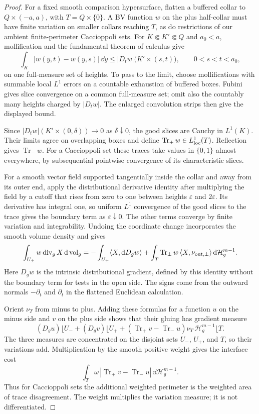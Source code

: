 \begin{proof}
For a fixed smooth comparison hypersurface, flatten a buffered collar to
$Q\times(-a,a)$, with $T=Q\times\{0\}$. A BV function $w$ on the
plus half-collar must have finite variation on smaller collars reaching
$T$, as do restrictions of our ambient finite-perimeter Caccioppoli sets. For
$K\Subset K'\Subset Q$ and $a_0<a$, mollification and the fundamental
theorem of calculus give
\begin{equation}\label{cut:fixed-face-slices}
 \int_K |w(y,t)-w(y,s)|\,\dd y
 \le |D_t w|\bigl(K'\times(s,t)\bigr),
 \qquad 0<s<t<a_0,
\end{equation}
on one full-measure set of heights. To pass to the limit, choose
mollifications with summable local $L^1$ errors on a countable exhaustion
of buffered boxes. Fubini gives slice convergence on a common
full-measure set; omit also the countably many heights charged by
$|D_t w|$. The enlarged convolution strips then give the displayed bound.

Since $|D_t w|(K'\times(0,\delta))\to0$ as $\delta\downarrow0$,
the good slices are Cauchy in $L^1(K)$. Their limits agree on overlapping
boxes and define $\operatorname{Tr}_+w\in L^1_{\rm loc}(T)$.
Reflection gives $\operatorname{Tr}_-w$. For a Caccioppoli set these traces take
values in $\{0,1\}$ almost everywhere, by subsequential pointwise
convergence of its characteristic slices.

For a smooth vector field supported tangentially inside the collar and
away from its outer end, apply the distributional derivative identity
after multiplying the field by a cutoff that rises from zero to one
between heights $\varepsilon$ and $2\varepsilon$. Its derivative has
integral one, so uniform $L^1$ convergence of the good slices to the
trace gives the boundary term as $\varepsilon\downarrow0$. The other
terms converge by finite variation and integrability. Undoing the
coordinate change incorporates the smooth volume density and gives
\[
 \int_{U_\pm}w\operatorname{div}_g X\,\mathrm d\operatorname{vol}_g
 =-\int_{U_\pm}\langle X,\mathrm d D_g w\rangle
   +\int_T\operatorname{Tr}_\pm w\,
              \langle X,\nu_{\mathrm{out},\pm}\rangle
                         \,\mathrm d\mathcal H_g^{m-1}.
\]
Here $D_gw$ is the intrinsic distributional gradient, defined by this
identity without the boundary term for tests in the open side. The signs
come from the outward normals $-\partial_t$ and $\partial_t$ in the
flattened Euclidean calculation.

Orient $\nu_T$ from minus to plus. Adding these formulas for a function
$u$ on the minus side and $v$ on the plus side shows that their gluing
has gradient measure
\[
 (D_g u)\lfloor U_-+(D_g v)\lfloor U_+
 +(\operatorname{Tr}_+v-\operatorname{Tr}_-u)
                  \nu_T\,\mathcal H_g^{m-1}\lfloor T.
\]
The three measures are concentrated on the disjoint sets $U_-$, $U_+$,
and $T$, so their variations add. Multiplication by the smooth positive
weight gives the interface cost
\[
 \int_T\omega\,
       |\operatorname{Tr}_+v-\operatorname{Tr}_-u|
                         \,\dd\mathcal H_g^{m-1}.
\]
Thus for Caccioppoli sets the additional weighted perimeter is the weighted area
of trace disagreement. The weight multiplies the variation measure;
it is not differentiated.


\end{proof}
